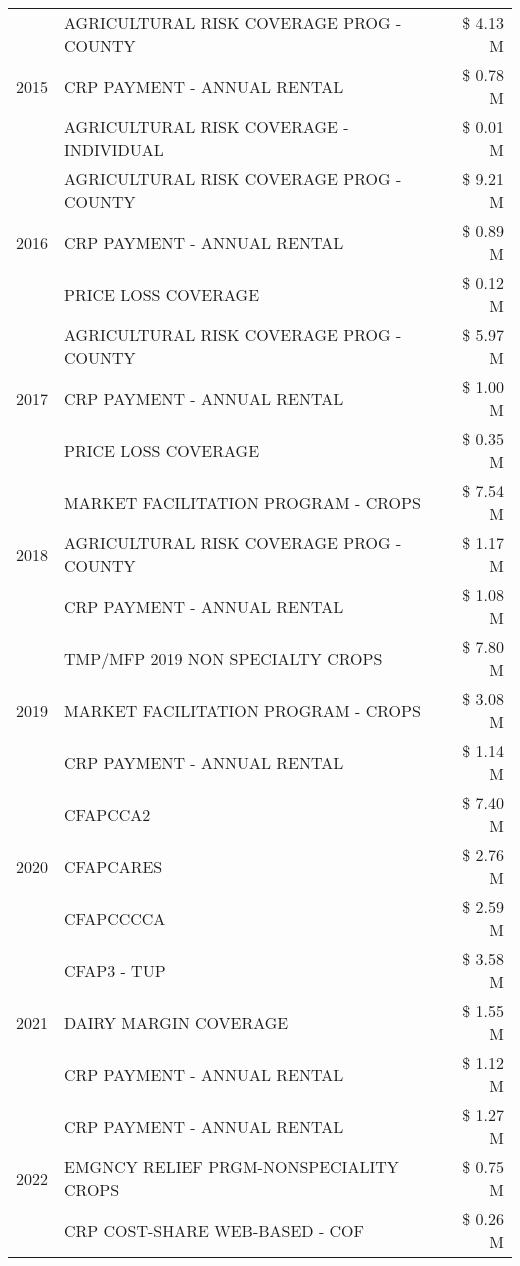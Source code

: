 \begin{tabular}{llr}
\multirow[t]{3}{*}{2015} & AGRICULTURAL RISK COVERAGE PROG - COUNTY & \$ 4.13 M \\
 & CRP PAYMENT - ANNUAL RENTAL & \$ 0.78 M \\
 & AGRICULTURAL RISK COVERAGE - INDIVIDUAL & \$ 0.01 M \\
\cline{1-3}
\multirow[t]{3}{*}{2016} & AGRICULTURAL RISK COVERAGE PROG - COUNTY & \$ 9.21 M \\
 & CRP PAYMENT - ANNUAL RENTAL & \$ 0.89 M \\
 & PRICE LOSS COVERAGE & \$ 0.12 M \\
\cline{1-3}
\multirow[t]{3}{*}{2017} & AGRICULTURAL RISK COVERAGE PROG - COUNTY & \$ 5.97 M \\
 & CRP PAYMENT - ANNUAL RENTAL & \$ 1.00 M \\
 & PRICE LOSS COVERAGE & \$ 0.35 M \\
\cline{1-3}
\multirow[t]{3}{*}{2018} & MARKET FACILITATION PROGRAM - CROPS & \$ 7.54 M \\
 & AGRICULTURAL RISK COVERAGE PROG - COUNTY & \$ 1.17 M \\
 & CRP PAYMENT - ANNUAL RENTAL & \$ 1.08 M \\
\cline{1-3}
\multirow[t]{3}{*}{2019} & TMP/MFP 2019 NON SPECIALTY CROPS & \$ 7.80 M \\
 & MARKET FACILITATION PROGRAM - CROPS & \$ 3.08 M \\
 & CRP PAYMENT - ANNUAL RENTAL & \$ 1.14 M \\
\cline{1-3}
\multirow[t]{3}{*}{2020} & CFAPCCA2 & \$ 7.40 M \\
 & CFAPCARES & \$ 2.76 M \\
 & CFAPCCCCA & \$ 2.59 M \\
\cline{1-3}
\multirow[t]{3}{*}{2021} & CFAP3 - TUP & \$ 3.58 M \\
 & DAIRY MARGIN COVERAGE & \$ 1.55 M \\
 & CRP PAYMENT - ANNUAL RENTAL & \$ 1.12 M \\
\cline{1-3}
\multirow[t]{3}{*}{2022} & CRP PAYMENT - ANNUAL RENTAL & \$ 1.27 M \\
 & EMGNCY RELIEF PRGM-NONSPECIALITY CROPS & \$ 0.75 M \\
 & CRP COST-SHARE WEB-BASED - COF & \$ 0.26 M \\
\cline{1-3}
\bottomrule
\end{tabular}
